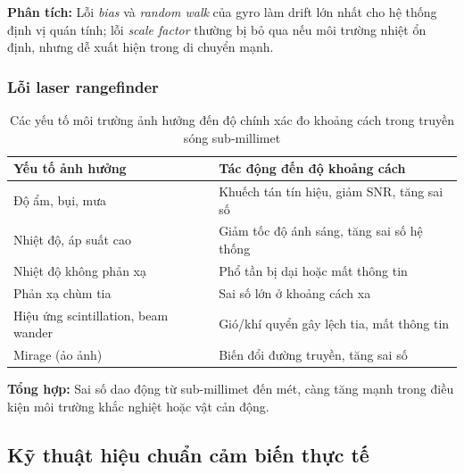 \noindent\textbf{Phân tích:} Lỗi \textit{bias} và \textit{random walk} của gyro làm drift lớn nhất cho hệ thống định vị quán tính; lỗi \textit{scale factor} thường bị bỏ qua nếu môi trường nhiệt ổn định, nhưng dễ xuất hiện trong di chuyển mạnh.
\subsubsection{Lỗi laser rangefinder}

 \begin{table}[h!]
\centering
\begin{tabular}{|l|p{7cm}|}
\hline
\textbf{Yếu tố ảnh hưởng} & \textbf{Tác động đến độ khoảng cách} \\
\hline
Độ ẩm, bụi, mưa & Khuếch tán tín hiệu, giảm SNR, tăng sai số \\
\hline
Nhiệt độ, áp suất cao & Giảm tốc độ ánh sáng, tăng sai số hệ thống \\
\hline
Nhiệt độ không phản xạ & Phổ tần bị dại hoặc mất thông tin \\
\hline
Phản xạ chùm tia & Sai số lớn ở khoảng cách xa \\
\hline
Hiệu ứng scintillation, beam wander & Gió/khí quyển gây lệch tia, mất thông tin \\
\hline
Mirage (ảo ảnh) & Biến đổi đường truyền, tăng sai số \\
\hline
\end{tabular}
\caption{Các yếu tố môi trường ảnh hưởng đến độ chính xác đo khoảng cách trong truyền sóng sub-millimet}
\end{table}

\noindent\textbf{Tổng hợp:} Sai số dao động từ sub-millimet đến mét, càng tăng mạnh trong điều kiện môi trường khắc nghiệt hoặc vật cản động.
   


\subsection{Kỹ thuật hiệu chuẩn cảm biến thực tế}
